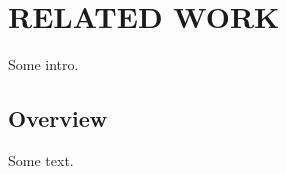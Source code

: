 \chapter{RELATED WORK\label{chapter:related_work}}

Some intro.

\section{Overview\label{sec:overview}}

Some text.
